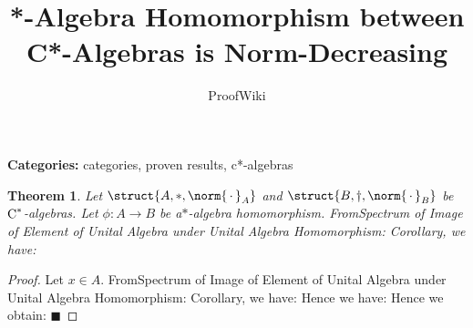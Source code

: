 \documentclass{article}
\title{*-Algebra Homomorphism between C*-Algebras is Norm-Decreasing}
\author{ProofWiki}
\date{}
\newtheorem{theorem}{Theorem}
\begin{document}
\maketitle

\noindent\textbf{Categories:} categories, proven results, c*-algebras

\begin{theorem}
Let $\struct {A, \ast, \norm {\, \cdot \,}_A}$ and $\struct {B, \dagger, \norm {\, \cdot \,}_B}$ be$\text C^\ast$-algebras. Let $\phi : A \to B$ be a$\ast$-algebra homomorphism. FromSpectrum of Image of Element of Unital Algebra under Unital Algebra Homomorphism: Corollary, we have:
\end{theorem}

\begin{proof}
Let $x \in A$. FromSpectrum of Image of Element of Unital Algebra under Unital Algebra Homomorphism: Corollary, we have: Hence we have: Hence we obtain: $\blacksquare$
\end{proof}
\end{document}
